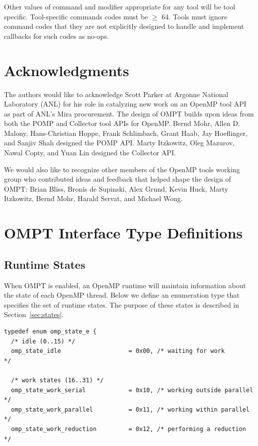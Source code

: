 \documentclass{article}
\begin{document}
{Other values of command  and modifier appropriate for any tool will be tool specific. Tool-specific commands codes must be $\geq$ 64. Tools must ignore command codes that they are not explicitly designed to handle and implement callbacks for such codes as no-ops.

\section*{Acknowledgments}

The authors would like to acknowledge Scott Parker at Argonne National Laboratory (ANL) for 
his role in catalyzing new work on an OpenMP tool API as part of ANL's Mira procurement.
The design of OMPT builds upon ideas from both the POMP and Collector tool APIs for OpenMP. 
Bernd Mohr, Allen D. Malony, Hans-Christian Hoppe, Frank Schlimbach, 
Grant Haab, Jay Hoeflinger, and Sanjiv Shah designed the POMP API. 
Marty Itzkowitz, Oleg Mazurov, Nawal Copty, and Yuan Lin designed the Collector API.

We would also like to recognize other members of the OpenMP tools working group who contributed ideas and feedback that helped shape the design of  OMPT: Brian Bliss, Bronis de Supinski, Alex Grund, Kevin Huck, Marty Itzkowitz, Bernd Mohr, Harald Servat, and Michael Wong.

 
 


\appendix
\clearpage


\section{OMPT Interface Type Definitions}
\label{appendix:ompt-types}
\subsection{Runtime States}
\label{appendix:ompt-types:states}

When OMPT is enabled, an OpenMP runtime will maintain information about the state of  each OpenMP thread. 
Below we define an enumeration type that specifies the set of runtime states. 
The purpose of these states is described in Section~\ref{sec:states}.

\begin{verbatim}
typedef enum omp_state_e {
  /* idle (0..15) */
  omp_state_idle                   = 0x00, /* waiting for work           */

  /* work states (16..31) */
  omp_state_work_serial            = 0x10, /* working outside parallel   */
  omp_state_work_parallel          = 0x11, /* working within parallel    */
  omp_state_work_reduction         = 0x12, /* performing a reduction     */


\end{verbatim}}
\end{document}
